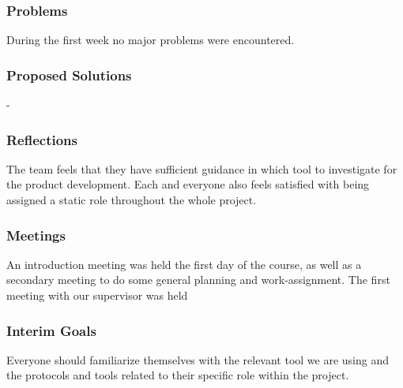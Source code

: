 \subsubsection{Problems}
During the first week no major problems were encountered.
\subsubsection{Proposed Solutions}
-
\subsubsection{Reflections}
The team feels that they have sufficient guidance in which tool to investigate for the product development. Each and everyone also feels satisfied with being assigned a static role throughout the whole project.
\subsubsection{Meetings}
An introduction meeting was held the first day of the course, as well as a secondary meeting to do some general planning and work-assignment. The first meeting with our supervisor was held 
\subsubsection{Interim Goals}
Everyone should familiarize themselves with the relevant tool we are using and the protocols and tools related to their specific role within the project.  
